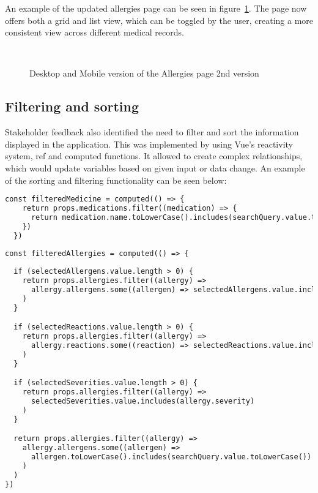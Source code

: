 An example of the updated allergies page can be seen in figure~\ref{fig:allergiespagev2}. The page now offers both a grid and list view, which can be toggled by the user, creating a more consistent view across different medical records.

\begin{figure}[ht]
  \centering
  \\[\baselineskip]
  \caption{Desktop and Mobile version of the Allergies page \- 2nd version}\label{fig:allergiespagev2}
\end{figure}

\subsection{Filtering and sorting}

Stakeholder feedback also identified the need to filter and sort the information displayed in the application. This was implemented by using Vue's reactivity system, ref and computed functions. It allowed to create complex relationships, which would update variables based on given input or data change. An example of the sorting and filtering functionality can be seen below:

\begin{lstlisting}[language=HTML, caption=Medication Sorting and Filtering]
  const filteredMedicine = computed(() => {
    return props.medications.filter((medication) => {
      return medication.name.toLowerCase().includes(searchQuery.value.toLowerCase())
    })
  })
\end{lstlisting}

\begin{lstlisting}[language=HTML, caption=Allergies Sorting and Filtering]
  const filteredAllergies = computed(() => {
  
  if (selectedAllergens.value.length > 0) {
    return props.allergies.filter((allergy) =>
      allergy.allergens.some((allergen) => selectedAllergens.value.includes(allergen))
    )
  }

  if (selectedReactions.value.length > 0) {
    return props.allergies.filter((allergy) =>
      allergy.reactions.some((reaction) => selectedReactions.value.includes(reaction))
    )
  }

  if (selectedSeverities.value.length > 0) {
    return props.allergies.filter((allergy) =>
      selectedSeverities.value.includes(allergy.severity)
    )
  }  

  return props.allergies.filter((allergy) =>
    allergy.allergens.some((allergen) =>
      allergen.toLowerCase().includes(searchQuery.value.toLowerCase())
    )
  )
})  
\end{lstlisting}

